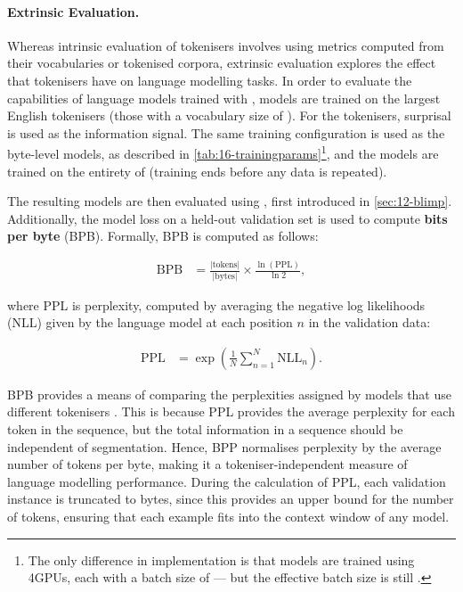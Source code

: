 \paragraph{Extrinsic Evaluation.} 

Whereas intrinsic evaluation of tokenisers involves using metrics computed from their vocabularies or tokenised corpora, extrinsic evaluation explores the effect that tokenisers have on language modelling tasks. In order to evaluate the capabilities of language models trained with \tokname, \llama models are trained on the largest English tokenisers (those with a vocabulary size of ). For the \tokname tokenisers, surprisal is used as the information signal. The same training configuration is used as the byte-level models, as described in \cref{tab:16-trainingparams}\footnote{The only difference in implementation is that models are trained using 4GPUs, each with a batch size of  --- but the effective batch size is still .}, and the models are trained on the entirety of \fineweb (training ends before any data is repeated).

The resulting models are then evaluated using \blimp, first introduced in \cref{sec:12-blimp}. Additionally, the model loss on a held-out validation set is used to compute \textbf{bits per byte} (BPB). Formally, BPB is computed as follows:

\begin{align}
    \mathrm{BPB} &= \frac{|\mathrm{tokens}|}{|\mathrm{bytes}|} \times \frac{\ln(\mathrm{PPL})}{\ln{2}},
\end{align}

where PPL is perplexity, computed by averaging the negative log likelihoods (NLL) given by the language model at each position $n$ in the validation data:

\begin{align}
    \mathrm{PPL} &= \exp{\left(\frac{1}{N} \sum_{n=1}^{N}{\mathrm{NLL}_n} \right)}.
\end{align}

BPB provides a means of comparing the perplexities assigned by models that use different tokenisers  \citep{choe2019bridging}. This is because PPL provides the average perplexity for each token in the sequence, but the total information in a sequence should be independent of segmentation. Hence, BPP normalises perplexity by the average number of tokens per byte, making it a tokeniser-independent measure of language modelling performance. During the calculation of PPL, each validation instance is truncated to  bytes, since this provides an upper bound for the number of tokens, ensuring that each example fits into the context window of any model.

